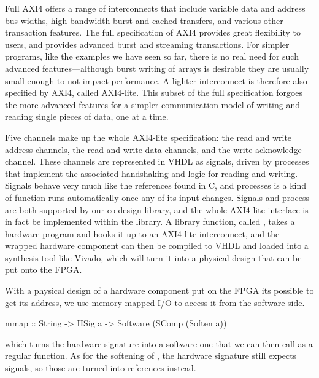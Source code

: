 \documentclass[../main.tex]{subfiles}
\begin{document}
Full AXI4 offers a range of interconnects that include variable data and address bus widths, high bandwidth burst and cached transfers, and various other transaction features. The full specification of AXI4 provides great flexibility to users, and provides advanced burst and streaming transactions. For simpler programs, like the examples we have seen so far, there is no real need for such advanced features---although burst writing of arrays is desirable they are usually small enough to not impact performance. A lighter interconnect is therefore also specified by AXI4, called AXI4-lite. This subset of the full specification forgoes the more advanced features for a simpler communication model of writing and reading single pieces of data, one at a time.

Five channels make up the whole AXI4-lite specification: the read and write address channels, the read and write data channels, and the write acknowledge channel. These channels are represented in VHDL as signals, driven by processes that implement the associated handshaking and logic for reading and writing. Signals behave very much like the references found in C, and processes is a kind of function runs automatically once any of its input changes. Signals and process are both supported by our co-design library, and the whole AXI4-lite interface is in fact be implemented within the library. A library function, called , takes a hardware program and hooks it up to an AXI4-lite interconnect, and the wrapped hardware component can then be compiled to VHDL and loaded into a synthesis tool like Vivado, which will turn it into a physical design that can be put onto the FPGA.

With a physical design of a hardware component put on the FPGA its possible to get its address, we use memory-mapped I/O to access it from the software side. 

\begin{code}
mmap :: String -> HSig a -> Software (SComp (Soften a))
\end{code}

\noindent which turns the hardware signature into a software one that we can then call as a regular function. As for the softening of , the hardware signature still expects signals, so those are turned into references instead.
\end{document}
